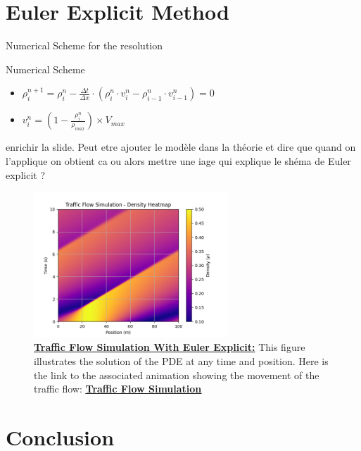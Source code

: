 \documentclass{beamer}
\begin{document}
\section{Euler Explicit Method}
\begin{frame}{Numerical Scheme for the resolution}
	\begin{alertblock}{Numerical Scheme}
		\begin{itemize}
			\item $\rho_{i}^{n+1} = \rho_i^n - \frac{\Delta t}{\Delta x} \cdot \left(\rho_i^n \cdot v_i^n - \rho_{i-1}^n \cdot v_{i-1}^n \right)
					=0$
		
			\item $v_i^n = \left( 1 - \frac{\rho_i^n}{\rho_{max}}\right)  \times V_{max}$
		\end{itemize}
	\end{alertblock}
	enrichir la slide. Peut etre ajouter le modèle dans la théorie et dire que quand on l'applique on obtient ca ou alors mettre une iage qui explique le shéma de Euler explicit ? 

\end{frame}

\begin{frame}
	\begin{figure}[H]
		\centering
		\includegraphics[width=0.65\textwidth]{traffic_flow_density_map.png}
		\caption[Traffic Flow Simulation With Euler Explicit]{\textbf{\underline{Traffic Flow Simulation With Euler Explicit:}} This figure illustrates the solution of the PDE at any time and position. Here is the link to the associated animation showing the movement of the traffic flow: \href{https://github.com/FlorentGerbaud/Simple-road-traffic-modeling/blob/Flo-PDE/SRTM/EDPMethod/CasTestToLaunch/TestToLaunch/Modele_IC_S/EulerExplicit/traffic_flow_animation.gif}{\textbf{\underline{Traffic Flow Simulation}}} }
		\label{fig:traffic_flow_density_map}
	\end{figure}
\end{frame}

\section{Conclusion}
\end{document}
